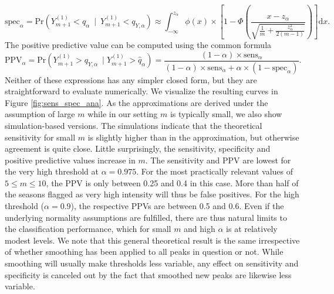\documentclass{article}
\begin{document}
\begin{equation}
\text{spec}_\alpha = \text{Pr}(Y_{m + 1}^{(1)} < \hat{q}_\alpha \ \mid \ Y_{m + 1}^{(1)} < q_{Y, \alpha}) \approx \int_{-\infty}^{z_\alpha}\phi(x) \times \left[1 - \Phi\left(\frac{x - z_\alpha}{\sqrt{\frac{1}{m} + \frac{z_\alpha^2}{2(m - 1)}}}\right)\right] \text{d}x.
\label{eq:spec}
\end{equation}
The positive predictive value can be computed using the common formula
\begin{equation}
\text{PPV}_\alpha = \text{Pr}(Y_{m + 1}^{(1)} > q_{Y, \alpha} \ \mid Y_{m + 1}^{(1)} > \hat{q}_\alpha) = \frac{(1 - \alpha) \times \text{sens}_\alpha}{(1 - \alpha) \times \text{sens}_\alpha + \alpha \times (1 - \text{spec}_\alpha)}.
\label{eq:ppv}
\end{equation}
Neither of these expressions has any simpler closed form, but they are straightforward to evaluate numerically. We visualize the resulting curves in Figure \ref{fig:sens_spec_ana}. As the approximations are derived under the assumption of large $m$ while in our setting $m$ is typically small, we also show simulation-based versions. The simulations indicate that the theoretical sensitivity for small $m$ is slightly higher than in the approximation, but otherwise agreement is quite close. Little surprisingly, the sensitivity, specificity and positive predictive values increase in $m$. The sensitivity and PPV are lowest for the very high threshold at $\alpha = 0.975$. For the most practically relevant values of $5 \leq m \leq 10$, the PPV is only between 0.25 and 0.4 in this case. More than half of the seasons flagged as very high intensity will thus be false positives. For the high threshold ($\alpha = 0.9$), the respective PPVs are between 0.5 and 0.6. Even if the underlying normality assumptions are fulfilled, there are thus natural limits to the classification performance, which for small $m$ and high $\alpha$ is at relatively modest levels. We note that this general theoretical result is the same irrespective of
 whether smoothing has been applied to all peaks in question or not. While smoothing will usually make thresholds less variable, any effect on sensitivity and specificity is canceled out by the fact that smoothed new peaks are likewise less variable.
\end{document}
